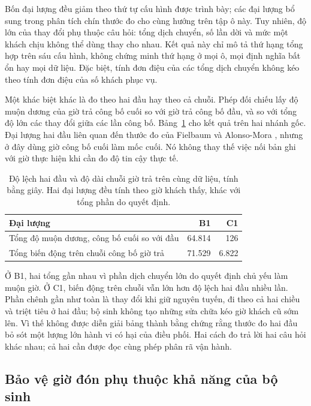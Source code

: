 Bốn đại lượng đều giảm theo thứ tự cấu hình được trình bày; các đại lượng bổ sung trong
phân tích chín thước đo cho cùng hướng trên tập ô này. Tuy nhiên, độ lớn của thay đổi phụ
thuộc câu hỏi: tổng dịch chuyển, số lần dời và mức một khách chịu không thể dùng thay cho
nhau. Kết quả này chỉ mô tả thứ hạng tổng hợp trên sáu cấu hình, không chứng minh thứ hạng
ở mọi ô, mọi định nghĩa bất ổn hay mọi dữ liệu. Đặc biệt, tính đơn điệu của các tổng dịch
chuyển không kéo theo tính đơn điệu của số khách phục vụ.

Một khác biệt khác là đo theo hai đầu hay theo cả chuỗi. Phép đối chiếu lấy độ muộn dương
của giờ trả công bố cuối so với giờ trả công bố đầu, và so với tổng độ lớn các thay đổi
giữa các lần công bố. Bảng~\ref{bang:kiemtra-hai-dau} cho kết quả trên hai nhánh gốc.
Đại lượng hai đầu liên quan đến thước đo của Fielbaum và Alonso-Mora
\cite{fielbaum2020}, nhưng ở đây dùng giờ công bố cuối làm mốc cuối. Nó không thay thế
việc nối bản ghi với giờ thực hiện khi cần đo độ tin cậy thực tế.

\begin{table}[htbp]
\centering
\caption{Độ lệch hai đầu và độ dài chuỗi giờ trả trên cùng dữ liệu, tính bằng giây.
Hai đại lượng đều tính theo giờ khách thấy, khác với tổng phần do quyết định.}
\label{bang:kiemtra-hai-dau}
\small
\begin{tabular}{@{}lrr@{}}
\toprule
\textbf{Đại lượng} & \textbf{B1} & \textbf{C1}\\
\midrule
Tổng độ muộn dương, công bố cuối so với đầu & 64.814 & 126\\
Tổng biến động trên chuỗi công bố giờ trả & 71.529 & 6.822\\
\bottomrule
\end{tabular}
\end{table}

Ở B1, hai tổng gần nhau vì phần dịch chuyển lớn do quyết định chủ yếu làm muộn giờ.
Ở C1, biến động trên chuỗi vẫn lớn hơn độ lệch hai đầu nhiều lần. Phần chênh gần như
toàn là thay đổi khi giữ nguyên tuyến, đi theo cả hai chiều và triệt tiêu ở hai đầu;
bộ sinh không tạo những sửa chữa kéo giờ khách cũ sớm lên. Vì thế không được diễn giải
bảng thành bằng chứng rằng thước đo hai đầu bỏ sót một lượng lớn hành vi có hại của
điều phối. Hai cách đo trả lời hai câu hỏi khác nhau; cả hai cần được đọc cùng phép
phân rã vận hành.

\subsection{Bảo vệ giờ đón phụ thuộc khả năng của bộ sinh}


